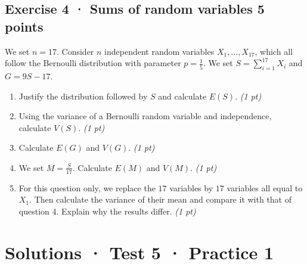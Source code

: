 \subsection*{Exercise 4 · Sums of random variables \hfill 5 points}We set $n=17$. Consider $n$ independent random variables $X_1,\ldots,X_{17}$, which all follow the Bernoulli distribution with parameter $p=\frac{1}{5}$. We set $S=\displaystyle\sum_{i=1}^{17}X_i$ and $G=9S-17$.

\begin{enumerate}

\item Justify the distribution followed by $S$ and calculate $E(S)$. \hfill\textit{(1 pt)}

\item Using the variance of a Bernoulli random variable and independence, calculate $V(S)$. \hfill\textit{(1 pt)}

\item Calculate $E(G)$ and $V(G)$. \hfill\textit{(1 pt)}

\item We set $M=\frac S{17}$. Calculate $E(M)$ and $V(M)$. \hfill\textit{(1 pt)}

\item For this question only, we replace the $17$ variables by $17$ variables all equal to $X_1$. Then calculate the variance of their mean and compare it with that of question 4. Explain why the results differ. \hfill\textit{(1 pt)}

\end{enumerate}

\ifmxteacher\mxnewpage

\section*{Solutions · Test 5 · Practice 1}\label{cor:7-1}

